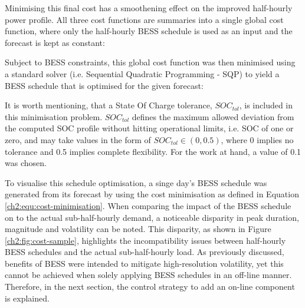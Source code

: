 Minimising this final cost has a smoothening effect on the improved half-hourly power profile.
All three cost functions are summaries into a single global cost function, where only the half-hourly BESS schedule is used as an input and the forecast is kept as constant:



Subject to BESS constraints, this global cost function was then minimised using a standard solver (i.e. Sequential Quadratic Programming - SQP) to yield a BESS schedule that is optimised for the given forecast:



It is worth mentioning, that a State Of Charge tolerance, $SOC_{tol}$, is included in this minimisation problem.
$SOC_{tol}$ defines the maximum allowed deviation from the computed SOC profile without hitting operational limits, i.e. SOC of one or zero, and may take values in the form of $SOC_{tol} \in (0, 0.5)$, where 0 implies no tolerance and 0.5 implies complete flexibility.
For the work at hand, a value of 0.1 was chosen.



To visualise this schedule optimisation, a singe day's BESS schedule was generated from its forecast by using the cost minimisation as defined in Equation \ref{ch2:equ:cost-minimisation}.
When comparing the impact of the BESS schedule on to the actual sub-half-hourly demand, a noticeable disparity in peak duration, magnitude and volatility can be noted.
This disparity, as shown in Figure \ref{ch2:fig:cost-sample}, highlights the incompatibility issues between half-hourly BESS schedules and the actual sub-half-hourly load.
As previously discussed, benefits of BESS were intended to mitigate high-resolution volatility, yet this cannot be achieved when solely applying BESS schedules in an off-line manner.
Therefore, in the next section, the control strategy to add an on-line component is explained.




 